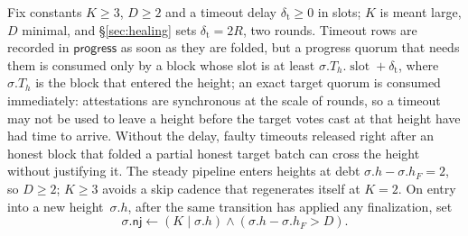 \documentclass{article}
\theoremstyle{plain}
\theoremstyle{definition}
\theoremstyle{remark}
\newcommand{\slot}{\operatorname{slot}}
\newcommand{\progressBit}{\mathsf{progress}}
\newcommand{\nj}{\mathsf{nj}}
\begin{document}
Fix constants $K\geq3$, $D\geq2$ and a timeout delay $\delta_{\mathrm{t}}\geq0$ in slots; $K$ is meant large, $D$ minimal, and \S\ref{sec:healing} sets $\delta_{\mathrm{t}}=2R$, two rounds. Timeout rows are recorded in $\progressBit$ as soon as they are folded, but a progress quorum that needs them is consumed only by a block whose slot is at least $\sigma.T_h.\slot+\delta_{\mathrm{t}}$, where $\sigma.T_h$ is the block that entered the height; an exact target quorum is consumed immediately: attestations are synchronous at the scale of rounds, so a timeout may not be used to leave a height before the target votes cast at that height have had time to arrive. Without the delay, faulty timeouts released right after an honest block that folded a partial honest target batch can cross the height without justifying it.
The steady pipeline enters heights at debt $\sigma.h-\sigma.h_F=2$, so $D\geq2$;
$K\geq3$ avoids a skip cadence that regenerates itself at $K=2$.
On entry into a new height~$\sigma.h$, after
the same transition has applied any finalization, set
\[
 \sigma.\nj\gets(K\mid\sigma.h)\wedge(\sigma.h-\sigma.h_F>D).
\]
\end{document}
